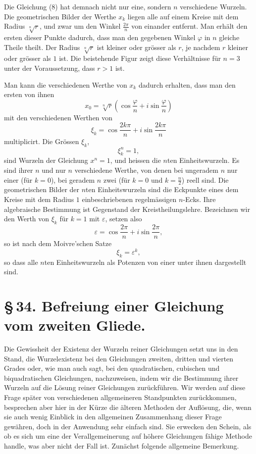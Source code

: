 \documentclass[11pt]{article}
\begin{document}
Die Gleichung (8) hat demnach nicht nur eine, sondern $n$ verschiedene Wurzeln. Die geometrischen Bilder der Werthe $x_k$ liegen alle auf einem Kreise mit dem Radius $\sqrt[n]{r}$, und zwar um den Winkel $\frac{2\pi}{n}$ von einander entfernt. Man erhält den ersten dieser Punkte dadurch, dass man den gegebenen Winkel $\varphi$ in $n$ gleiche Theile theilt. Der Radius $\sqrt[n]{r}$ ist kleiner oder grösser als $r$, je nachdem $r$ kleiner oder grösser als $1$ ist. Die beistehende Figur zeigt diese Verhältnisse für $n=3$ unter der Voraussetzung, dass $r>1$ ist.

Man kann die verschiedenen Werthe von $x_k$ dadurch erhalten, dass man den ersten von ihnen
\[
 x_0=\sqrt[n]{r}\left(\cos\frac{\varphi}{n}+i\sin\frac{\varphi}{n}\right)
\]
mit den verschiedenen Werthen von
\begin{equation}
 \xi_k=\cos\frac{2k\pi}{n}+i\sin\frac{2k\pi}{n}
\tag{11}
\end{equation}
multiplicirt. Die Grössen $\xi_k$,
\begin{equation}
 \xi_k^n=1,
\tag{12}
\end{equation}
sind Wurzeln der Gleichung $x^n=1$, und heissen die $n$ten Einheitswurzeln. Es sind ihrer $n$ und nur $n$ verschiedene Werthe, von denen bei ungeradem $n$ nur einer (für $k=0$), bei geradem $n$ zwei (für $k=0$ und $k=\frac n2$) reell sind. Die geometrischen Bilder der $n$ten Einheitswurzeln sind die Eckpunkte eines dem Kreise mit dem Radius $1$ einbeschriebenen regelmässigen $n$-Ecks. Ihre algebraische Bestimmung ist Gegenstand der Kreistheilungslehre. Bezeichnen wir den Werth von $\xi_k$ für $k=1$ mit $\varepsilon$, setzen also
\[
 \varepsilon=\cos\frac{2\pi}{n}+i\sin\frac{2\pi}{n},
\]
so ist nach dem Moivre'schen Satze
\[
 \xi_k=\varepsilon^k,
\]
so dass alle $n$ten Einheitswurzeln als Potenzen von einer unter ihnen dargestellt sind.


\section*{\S\,34. Befreiung einer Gleichung vom zweiten Gliede.}

Die Gewissheit der Existenz der Wurzeln reiner Gleichungen setzt uns in den Stand, die Wurzelexistenz bei den Gleichungen zweiten, dritten und vierten Grades oder, wie man auch sagt, bei den quadratischen, cubischen und biquadratischen Gleichungen, nachzuweisen, indem wir die Bestimmung ihrer Wurzeln auf die Lösung reiner Gleichungen zurückführen. Wir werden auf diese Frage später von verschiedenen allgemeineren Standpunkten zurückkommen, besprechen aber hier in der Kürze die älteren Methoden der Auflösung, die, wenn sie auch wenig Einblick in den allgemeinen Zusammenhang dieser Frage gewähren, doch in der Anwendung sehr einfach sind. Sie erwecken den Schein, als ob es sich um eine der Verallgemeinerung auf höhere Gleichungen fähige Methode handle, was aber nicht der Fall ist. Zunächst folgende allgemeine Bemerkung.
\end{document}
